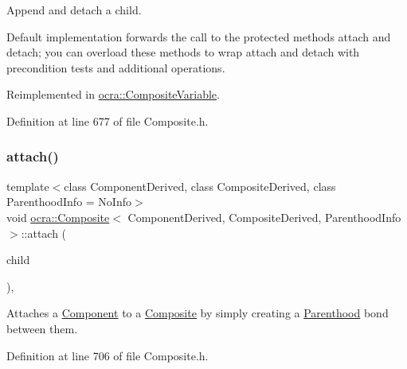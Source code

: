Append and detach a child. 

Default implementation forwards the call to the protected methods attach and detach; you can overload these methods to wrap attach and detach with precondition tests and additional operations. 

Reimplemented in \hyperlink{classocra_1_1CompositeVariable_a3915b8d93a37f7431ce682bdbf725758}{ocra\+::\+Composite\+Variable}.



Definition at line 677 of file Composite.\+h.

\hypertarget{classocra_1_1Composite_aad6fa3cad37014c0d7a09adf336aafa7}{}\label{classocra_1_1Composite_aad6fa3cad37014c0d7a09adf336aafa7} 
\subsubsection{\texorpdfstring{attach()}{attach()}}
{\footnotesize\ttfamily template$<$class Component\+Derived, class Composite\+Derived, class Parenthood\+Info = No\+Info$>$ \\
void \hyperlink{classocra_1_1Composite}{ocra\+::\+Composite}$<$ Component\+Derived, Composite\+Derived, Parenthood\+Info $>$\+::attach (\begin{DoxyParamCaption}\item[{Component\+Derived \&}]{child }\end{DoxyParamCaption})\hspace{0.3cm}{\ttfamily [inline]}, {\ttfamily [protected]}}



Attaches a \hyperlink{classocra_1_1Component}{Component} to a \hyperlink{classocra_1_1Composite}{Composite} by simply creating a \hyperlink{classocra_1_1Parenthood}{Parenthood} bond between them. 



Definition at line 706 of file Composite.\+h.

\hypertarget{classocra_1_1Composite_aa1e83d4f1a905bfdebfc9c670c1e819a}{}\label{classocra_1_1Composite_aa1e83d4f1a905bfdebfc9c670c1e819a} 
